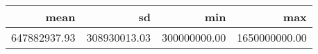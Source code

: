 \begin{table}[ht]
\centering
\begin{tabular}{rrrr}
  \hline
mean & sd & min & max \\ 
  \hline
647882937.93 & 308930013.03 & 300000000.00 & 1650000000.00 \\ 
   \hline
\end{tabular}
\end{table}
